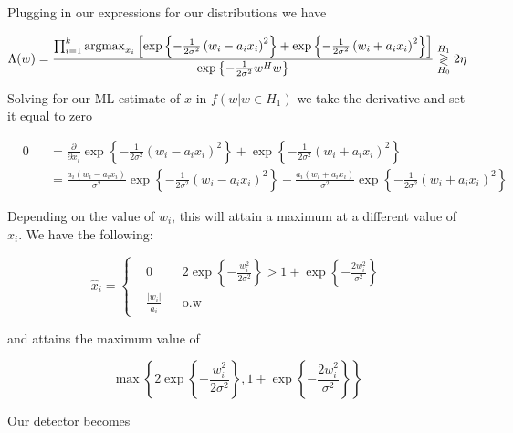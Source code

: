 \documentclass[english]{article}
\begin{document}
Plugging in our expressions for our distributions we have

\begin{equation}
\Lambda(w) = \frac{\prod_{i=1}^k\mathop{\rm argmax}_{x_i}\left[\exp\left\{-\frac{1}{2\sigma^2}\left(w_i-a_ix_i\right)^2\right\}+\exp\left\{-\frac{1}{2\sigma^2}\left(w_i+a_ix_i\right)^2\right\}\right]}{\exp\left\{-\frac{1}{2\sigma^2}w^Hw\right\}} \overset{H_1}{\underset{H_0}{\gtrless}} 2\eta
\end{equation}

Solving for our ML estimate of $x$ in $f(w|w\in H_1)$ we take the derivative and set it equal to zero

\begin{equation}
\begin{aligned}
&0
&&= \frac{\partial}{\partial x_i}\exp\left\{-\frac{1}{2\sigma^2}\left(w_i-a_ix_i\right)^2\right\}+\exp\left\{-\frac{1}{2\sigma^2}\left(w_i+a_ix_i\right)^2\right\}\\
&&& = \frac{a_i\left(w_i-a_ix_i\right)}{\sigma^2}\exp\left\{-\frac{1}{2\sigma^2}\left(w_i-a_ix_i\right)^2\right\}-\frac{a_i\left(w_i+a_ix_i\right)}{\sigma^2}\exp\left\{-\frac{1}{2\sigma^2}\left(w_i+a_ix_i\right)^2\right\}
\end{aligned}
\end{equation}

Depending on the value of $w_i$, this will attain a maximum at a different value of $x_i$. We have the following:

\begin{equation}
\hat{x}_i=\left\{
\begin{aligned}
&0
&&2\exp\left\{-\frac{w_i^2}{2\sigma^2}\right\} > 1 + \exp\left\{-\frac{2w_i^2}{\sigma^2}\right\}\\
& \frac{|w_i|}{a_i}
&& \text{o.w}
\end{aligned}
\right.
\end{equation}

and attains the maximum value of

\begin{equation}
\max\left\{2\exp\left\{-\frac{w_i^2}{2\sigma^2}\right\} , 1 + \exp\left\{-\frac{2w_i^2}{\sigma^2}\right\}\right\}
\end{equation}

Our detector becomes
\end{document}
